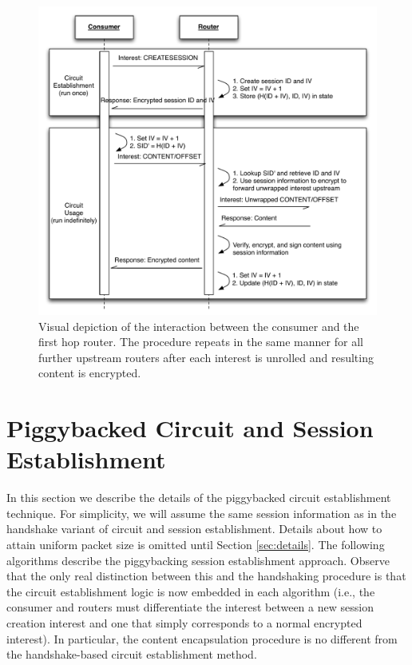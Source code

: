 \documentclass[10pt]{article}
\begin{document}
\begin{figure}[ht!]
\begin{center}
\includegraphics[scale=0.65]{./images/circuit_usage.pdf}
\end{center}
\caption{Visual depiction of the interaction between the consumer and the first hop router. The procedure repeats in the same manner for all further upstream routers after each interest is unrolled and resulting content is encrypted.}
\label{fig:circuit_usage}
\end{figure}

\section{Piggybacked Circuit and Session Establishment}
In this section we describe the details of the piggybacked circuit establishment technique. For simplicity, we will assume the same session information as in the handshake variant of circuit and session establishment. Details about how to attain uniform packet size is omitted until Section \ref{sec:details}. The following algorithms describe the piggybacking session establishment approach. Observe that the only real distinction between this and the handshaking procedure is that the circuit establishment logic is now embedded in each algorithm (i.e., the consumer and routers must differentiate the interest between a new session creation interest and one that simply corresponds to a normal encrypted interest). In particular, the content encapsulation procedure is no different from the handshake-based circuit establishment method.
\end{document}
